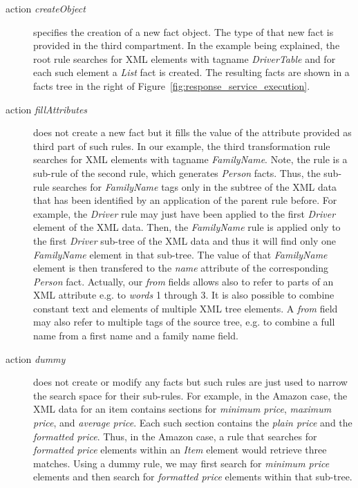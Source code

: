 \documentclass{fast_latex}
\begin{document}
\begin{description}
	\item[action \emph{createObject}] specifies the creation of a new fact object. The type of that new fact is provided in the third compartment. In the example being explained, the root rule searches for XML elements with tagname \emph{DriverTable} and for each such element a \emph{List} fact is created. The resulting facts are shown in a facts tree in the right of Figure~\ref{fig:response_service_execution}.
	\item[action \emph{fillAttributes}] does not create a new fact but it fills the value of the attribute provided as third part of such rules. In our example, the third transformation rule searches for XML elements with tagname \emph{FamilyName}. Note, the rule is a sub-rule of the second rule, which generates \emph{Person} facts. Thus, the sub-rule searches for \emph{FamilyName} tags only in the subtree of the XML data that has been identified by an application of the parent rule before. For example, the \emph{Driver} rule may just have been applied to the first \emph{Driver} element of the XML data. Then, the \emph{FamilyName} rule is applied only to the first \emph{Driver} sub-tree of the XML data and thus it will find only one \emph{FamilyName} element in that sub-tree. The value of that \emph{FamilyName} element is then transfered to the \emph{name} attribute of the corresponding \emph{Person} fact. Actually, our \textit{from} fields allows also to refer to parts of an XML attribute e.g. to \textit{words} 1 through 3. It is also possible to combine constant text and elements of multiple XML tree elements. A \textit{from} field may also refer to multiple tags of the source tree, e.g. to combine a full name from a first name and a family name field.  
	\item[action \emph{dummy}] does not create or modify any facts but such rules are just used to narrow the search space for their sub-rules. For example, in the Amazon case, the XML data for an item contains sections for \emph{minimum price}, \emph{maximum price}, and \emph{average price}. Each such section contains the \emph{plain price} and the \emph{formatted price}. Thus, in the Amazon case, a rule that searches for \emph{formatted price} elements within an \emph{Item} element would retrieve three matches. Using a dummy rule, we may first search for \emph{minimum price} elements and then search for \emph{formatted price} elements within that sub-tree.
\end{description}
\end{document}
